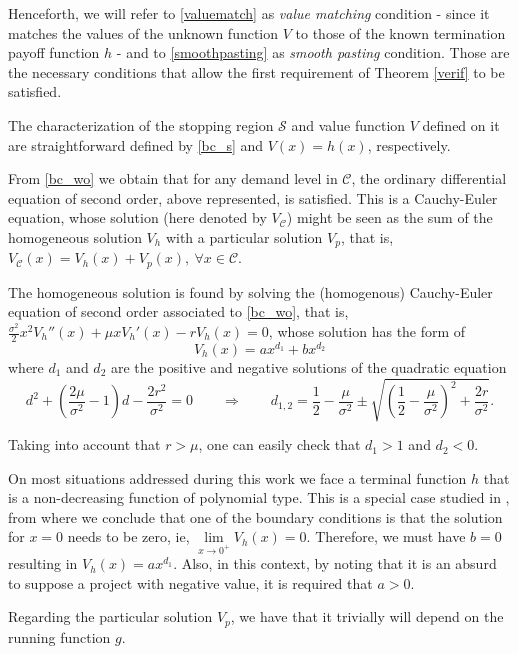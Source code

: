 Henceforth, we will refer to \eqref{valuematch} as \textit{value matching} condition - since it matches the values of the unknown function $V$ to those of the known termination payoff function $h$ - and to \eqref {smoothpasting} as \textit{smooth pasting} condition. Those are the necessary conditions that allow the first requirement of Theorem \ref{verif} to be satisfied.

The characterization of the stopping region $\mathcal{S}$ and value function $V$ defined on it are straightforward defined by \eqref{bc_s} and $V(x)=h(x)$, respectively.

From \eqref{bc_wo} we obtain that for any demand level in $\mathcal{C}$, the ordinary differential equation of second order, above represented, is satisfied. This is a Cauchy-Euler equation, whose solution (here denoted by $V_\mathcal{C}$) might be seen as the sum of the homogeneous solution $V_h$ with a particular solution $V_p$, that is, $V_\mathcal{C}(x)=V_h(x)+V_p(x), \ \forall x \in \mathcal{C}$.

The homogeneous solution is found by solving the (homogenous) Cauchy-Euler equation of second order associated to \eqref{bc_wo}, that is, $\frac{\sigma^2}{2}x^2 V_h''(x)+\mu x V_h'(x) - r V_h(x)=0$, whose solution has the form of
$$ V_h(x)=ax^{d_1}+bx^{d_2}$$
where $d_1$ and $d_2$ are the positive and negative solutions of the quadratic equation
\begin{equation}
d^2+\left( \frac{2 \mu}{\sigma^2}-1 \right)d-\frac{2r^2}{\sigma^2}=0 \qquad  \Rightarrow \qquad   d_{1,2}= \frac{1}{2}-\frac{\mu}{\sigma^2} \pm \sqrt{\left( \frac{1}{2} -\frac{\mu}{\sigma^2} \right) ^2+ \frac{2r}{\sigma^2}}.
\label{d1d2}
\end{equation}

Taking into account that $r>\mu$, one can easily check that $d_1>1$ and $d_2<0$.

On most situations addressed during this work we face a terminal function $h$ that is a non-decreasing function of polynomial type. This is a special case studied in \cite{guerra}, from where we conclude that one of the boundary conditions is that the solution for $x=0$ needs to be zero, ie, $\underset{x\to 0^+}{\lim} V_h(x)=0$. Therefore, we must have $b=0$ resulting in $V_h(x)=ax^{d_1}$.
Also, in this context, by noting that it is an absurd to suppose a project with negative value, it is required that $a>0$.


Regarding the particular solution $V_p$, we have that it trivially will depend on the running function $g$.

